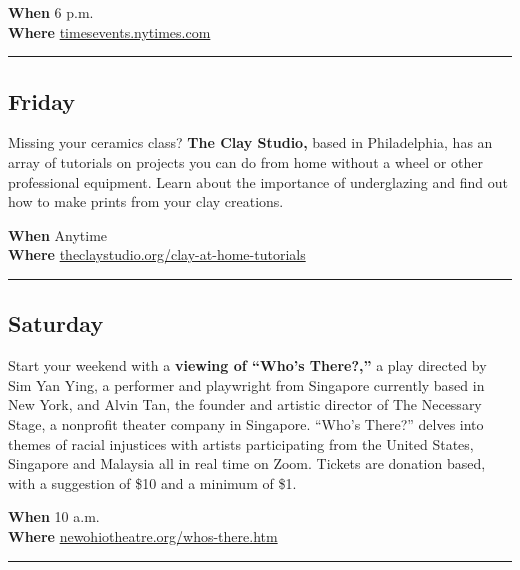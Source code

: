 \textbf{When} 6 p.m.\\
\textbf{Where}
\href{https://timesevents.nytimes.com/astorywritingclasswithcurtissittenfeld}{timesevents.nytimes.com}

\begin{center}\rule{0.5\linewidth}{\linethickness}\end{center}

\hypertarget{friday}{%
\subsection{Friday}\label{friday}}

Missing your ceramics class? \textbf{The Clay Studio,} based in
Philadelphia, has an array of tutorials on projects you can do from home
without a wheel or other professional equipment. Learn about the
importance of underglazing and find out how to make prints from your
clay creations.

\textbf{When} Anytime\\
\textbf{Where}
\href{https://www.theclaystudio.org/clay-at-home-tutorials}{theclaystudio.org/clay-at-home-tutorials}

\begin{center}\rule{0.5\linewidth}{\linethickness}\end{center}

\hypertarget{saturday}{%
\subsection{Saturday}\label{saturday}}

Start your weekend with a \textbf{viewing of ``Who's There?,''} a play
directed by Sim Yan Ying, a performer and playwright from Singapore
currently based in New York, and Alvin Tan, the founder and artistic
director of The Necessary Stage, a nonprofit theater company in
Singapore. ``Who's There?'' delves into themes of racial injustices with
artists participating from the United States, Singapore and Malaysia all
in real time on Zoom. Tickets are donation based, with a suggestion of
\$10 and a minimum of \$1.

\textbf{When} 10 a.m.\\
\textbf{Where}
\href{http://newohiotheatre.org/whos-there.htm}{newohiotheatre.org/whos-there.htm}

\begin{center}\rule{0.5\linewidth}{\linethickness}\end{center}


